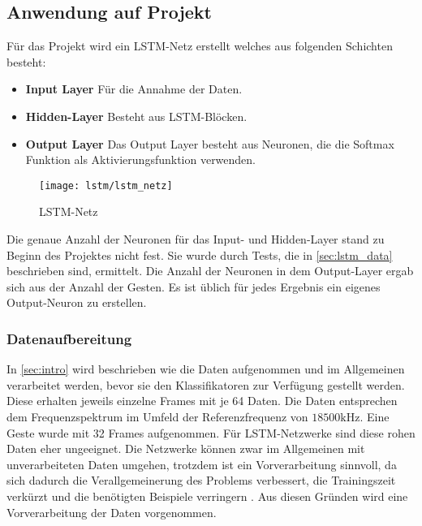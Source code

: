 \subsection{Anwendung auf Projekt}
Für das Projekt wird ein LSTM-Netz erstellt welches aus folgenden Schichten besteht:

\begin{itemize}
\item \textbf{Input Layer} Für die Annahme der Daten.
\item \textbf{Hidden-Layer} Besteht aus LSTM-Blöcken.
\item \textbf{Output Layer} Das Output Layer besteht aus Neuronen, die die 
Softmax Funktion als Aktivierungsfunktion verwenden.
\end{itemize}

\begin{figure}[htbp]
    \centering
   \texttt{[image: lstm/lstm\_netz]}
\caption{LSTM-Netz}
\label{fig:lstm_netz}
\end{figure}
Die genaue Anzahl der Neuronen für das Input- und Hidden-Layer stand zu Beginn
des Projektes nicht fest. Sie wurde durch Tests, die in \autoref{sec:lstm_data}
beschrieben sind, ermittelt. Die Anzahl der Neuronen in dem Output-Layer ergab
sich aus der Anzahl der Gesten. Es ist üblich für jedes Ergebnis ein eigenes
Output-Neuron zu erstellen.

\subsubsection{Datenaufbereitung}
\label{sec:lstm_data} 

In \autoref{sec:intro} wird beschrieben wie die Daten aufgenommen und im
Allgemeinen verarbeitet werden, bevor sie den Klassifikatoren zur Verfügung
gestellt werden. Diese erhalten jeweils einzelne Frames mit je 64 Daten. Die
Daten entsprechen dem Frequenzspektrum im Umfeld der Referenzfrequenz von
$18500\text{kHz}$. Eine Geste wurde mit 32 Frames aufgenommen. Für
\ac{LSTM}-Netzwerke sind diese rohen Daten eher ungeeignet. Die Netzwerke können
zwar im Allgemeinen mit unverarbeiteten Daten umgehen, trotzdem ist ein
Vorverarbeitung sinnvoll, da sich dadurch die Verallgemeinerung des Problems
verbessert, die Trainingszeit verkürzt und die benötigten Beispiele verringern
\cite{RainerSchmoll2006}. Aus diesen Gründen wird eine Vorverarbeitung der Daten
vorgenommen.

